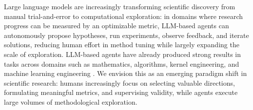 \documentclass{article} %
\begin{document}
   Large language models are increasingly transforming scientific discovery from manual trial-and-error to computational exploration:
   in domains where research progress can be measured by
   an optimizable metric, LLM-based agents can autonomously propose hypotheses, run experiments, observe feedback, and iterate solutions, reducing human effort in method tuning while largely expanding the scale of exploration. 
   LLM-based agents have already produced strong results in tasks across domains such as mathematics, algorithms, kernel engineering, and machine learning engineering \citep{aide,alphaevolve,shinkaevolve,thetaevolve,tttdiscover,kernelbench,mlebench,rdagent,aibuildai,li2025fmagent}.
   We envision this as an emerging paradigm shift in scientific research: humans increasingly focus on selecting valuable directions, formulating meaningful metrics, and supervising validity, while agents execute large volumes of methodological exploration.
   
\end{document}
